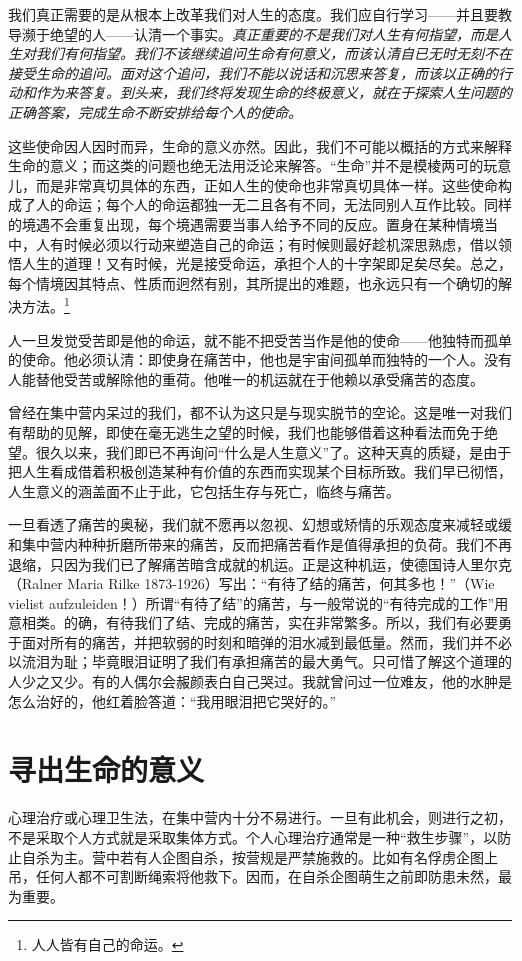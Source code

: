 \documentclass[11pt,oneside]{book}
\begin{document}
\begin{common-format}
我们真正需要的是从根本上改革我们对人生的态度。我们应自行学习——并且要教导濒于绝望的人——认清一个事实。\emph{真正重要的不是我们对人生有何指望，而是人生对我们有何指望。我们不该继续追问生命有何意义，而该认清自已无时无刻不在接受生命的追问。面对这个追问，我们不能以说话和沉思来答复，而该以正确的行动和作为来答复。到头来，我们终将发现生命的终极意义，就在于探索人生问题的正确答案，完成生命不断安排给每个人的使命。}

这些使命因人因时而异，生命的意义亦然。因此，我们不可能以概括的方式来解释生命的意义；而这类的问题也绝无法用泛论来解答。“生命”并不是模棱两可的玩意儿，而是非常真切具体的东西，正如人生的使命也非常真切具体一样。这些使命构成了人的命运；每个人的命运都独一无二且各有不同，无法同别人互作比较。同样的境遇不会重复出现，每个境遇需要当事人给予不同的反应。置身在某种情境当中，人有时候必须以行动来塑造自己的命运；有时候则最好趁机深思熟虑，借以领悟人生的道理！又有时候，光是接受命运，承担个人的十字架即足矣尽矣。总之，每个情境因其特点、性质而迥然有别，其所提出的难题，也永远只有一个确切的解决方法。\footnote{人人皆有自己的命运。}

人一旦发觉受苦即是他的命运，就不能不把受苦当作是他的使命——他独特而孤单的使命。他必须认清：即使身在痛苦中，他也是宇宙间孤单而独特的一个人。没有人能替他受苦或解除他的重荷。他唯一的机运就在于他赖以承受痛苦的态度。

曾经在集中营内呆过的我们，都不认为这只是与现实脱节的空论。这是唯一对我们有帮助的见解，即使在毫无逃生之望的时候，我们也能够借着这种看法而免于绝望。很久以来，我们即已不再询问“什么是人生意义”了。这种天真的质疑，是由于把人生看成借着积极创造某种有价值的东西而实现某个目标所致。我们早已彻悟，人生意义的涵盖面不止于此，它包括生存与死亡，临终与痛苦。

一旦看透了痛苦的奥秘，我们就不愿再以忽视、幻想或矫情的乐观态度来减轻或缓和集中营内种种折磨所带来的痛苦，反而把痛苦看作是值得承担的负荷。我们不再退缩，只因为我们已了解痛苦暗含成就的机运。正是这种机运，使德国诗人里尔克（Ralner Maria Rilke 1873-1926）写出：“有待了结的痛苦，何其多也！”（Wie vielist aufzuleiden！）所谓“有待了结”的痛苦，与一般常说的“有待完成的工作”用意相类。的确，有待我们了结、完成的痛苦，实在非常繁多。所以，我们有必要勇于面对所有的痛苦，并把软弱的时刻和暗弹的泪水减到最低量。然而，我们并不必以流泪为耻；毕竟眼泪证明了我们有承担痛苦的最大勇气。只可惜了解这个道理的人少之又少。有的人偶尔会赧颜表白自己哭过。我就曾问过一位难友，他的水肿是怎么治好的，他红着脸答道：“我用眼泪把它哭好的。”


\section{寻出生命的意义}
心理治疗或心理卫生法，在集中营内十分不易进行。一旦有此机会，则进行之初，不是采取个人方式就是采取集体方式。个人心理治疗通常是一种“救生步骤”，以防止自杀为主。营中若有人企图自杀，按营规是严禁施救的。比如有名俘虏企图上吊，任何人都不可割断绳索将他救下。因而，在自杀企图萌生之前即防患未然，最为重要。


\end{common-format}
\end{document}
